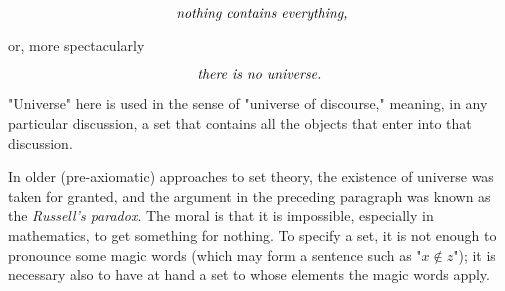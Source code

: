 \begin{equation*}
\text{ \textit{nothing contains everything,}}
\end{equation*}

or, more spectacularly

\begin{equation*}
\text{\textit{there is no universe.}}
\end{equation*}

"Universe" here is used in the sense of "universe of discourse," meaning, in any particular discussion, a set that contains all the objects that enter into that discussion. 

In older (pre-axiomatic) approaches to set theory, the existence of universe was taken for granted, and the argument in the preceding paragraph was known as the \textit{Russell's paradox}. The moral is that it is impossible, especially in mathematics, to get something for nothing. To specify a set, it is not enough to pronounce some magic words (which may form a sentence such as "$x \notin z$"); it is necessary also to have at hand a set to whose elements the magic words apply. 